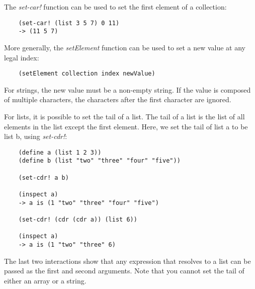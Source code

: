The {\it set-car!} function can be used to set the first element of
a collection:

\begin{verbatim}
    (set-car! (list 3 5 7) 0 11)
    -> (11 5 7)
\end{verbatim}

More generally, the {\it setElement} function can be used to set a new value
at any legal index:

\begin{verbatim}
    (setElement collection index newValue)
\end{verbatim}

For strings, the new value must be a non-empty string. If the
value is composed of multiple characters, the characters after
the first character are ignored.

For lists, it is possible to set the tail of a list. 
The tail of a list is the list of all elements in the list 
except the first element. Here, we set the tail of list a
to be list b, using {\it set-cdr!}:

\begin{verbatim}
    (define a (list 1 2 3))
    (define b (list "two" "three" "four" "five"))

    (set-cdr! a b)
    
    (inspect a)
    -> a is (1 "two" "three" "four" "five")

    (set-cdr! (cdr (cdr a)) (list 6))

    (inspect a)
    -> a is (1 "two" "three" 6)
\end{verbatim}

The last two interactions show that any expression that resolves
to a list can be passed as the first and second arguments.
Note that you cannot set the tail of either an array or a string.
